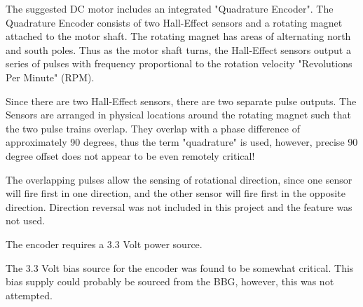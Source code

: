The suggested DC motor includes an integrated "Quadrature Encoder".  The Quadrature Encoder consists of two Hall-Effect sensors and a rotating magnet attached to the motor shaft.  The rotating magnet has areas of alternating north and south poles.  Thus as the motor shaft turns, the Hall-Effect sensors output a series of pulses with frequency proportional to the rotation velocity "Revolutions Per Minute" (RPM).

Since there are two Hall-Effect sensors, there are two separate pulse outputs.  The Sensors are arranged in physical locations around the rotating magnet such that the two pulse trains overlap.  They overlap with a phase difference of approximately 90 degrees, thus the term "quadrature" is used, however, precise 90 degree offset does not appear to be even remotely critical!

The overlapping pulses allow the sensing of rotational direction, since one sensor will fire first in one direction, and the other sensor will fire first in the opposite direction.  Direction reversal was not included in this project and the feature was not used.

The encoder requires a 3.3 Volt power source.

The 3.3 Volt bias source for the encoder was found to be somewhat critical.  This bias supply could probably be sourced from the BBG, however, this was not attempted.